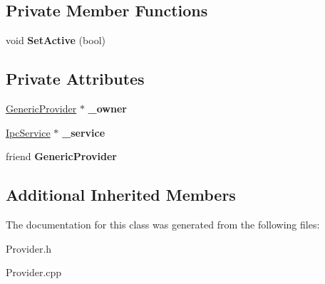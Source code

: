 \subsection*{Private Member Functions}
\begin{DoxyCompactItemize}
\item 
\mbox{\label{class_generic_provider_1_1_service_a8867bd15736c5960f1be828f9a4cf4bd}} 
void {\bfseries Set\+Active} (bool)
\end{DoxyCompactItemize}
\subsection*{Private Attributes}
\begin{DoxyCompactItemize}
\item 
\mbox{\label{class_generic_provider_1_1_service_a840935e6d0595a24f556a6eb8910cbf4}} 
\hyperlink{class_generic_provider}{Generic\+Provider} $\ast$ {\bfseries \+\_\+owner}
\item 
\mbox{\label{class_generic_provider_1_1_service_ac9f9b376bce3517972fdd3ce8602a8c4}} 
\hyperlink{class_ipc_service}{Ipc\+Service} $\ast$ {\bfseries \+\_\+service}
\item 
\mbox{\label{class_generic_provider_1_1_service_a8b04a7021f12e8a6de3f1f7d537d815a}} 
friend {\bfseries Generic\+Provider}
\end{DoxyCompactItemize}
\subsection*{Additional Inherited Members}


The documentation for this class was generated from the following files\+:\begin{DoxyCompactItemize}
\item 
Provider.\+h\item 
Provider.\+cpp\end{DoxyCompactItemize}
